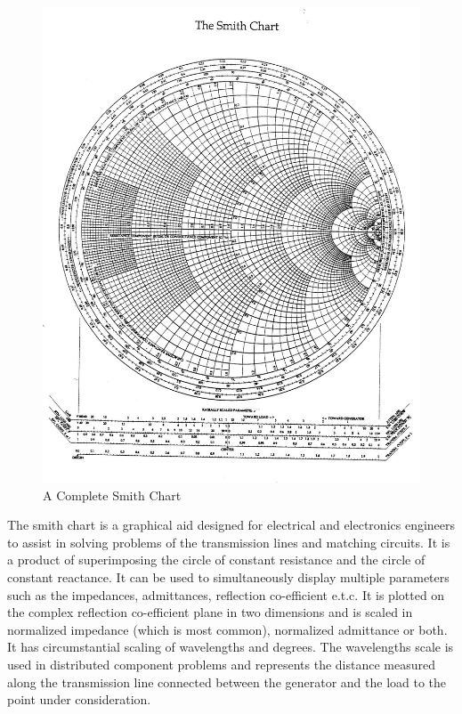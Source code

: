 \begin{figure}[h]
\centering
\includegraphics[width=0.7\linewidth]{"./graphics/smith_chart (2)"}
\caption{A Complete Smith Chart}
\label{fig:smithchart-2}
\end{figure}

The smith chart is a graphical aid designed for electrical and electronics engineers to assist in solving problems of the transmission lines and matching circuits. It is a product of superimposing the circle of constant resistance and the circle of constant reactance. It can be used to simultaneously display multiple parameters such as the impedances, admittances, reflection co-efficient e.t.c.
It is plotted on the complex reflection co-efficient plane in two dimensions and is scaled in normalized impedance (which is most common), normalized admittance or both. It has circumstantial scaling of wavelengths and degrees. The wavelengths scale is used in distributed component problems and represents the distance measured along the transmission line connected between the generator and the load to the point under consideration.

